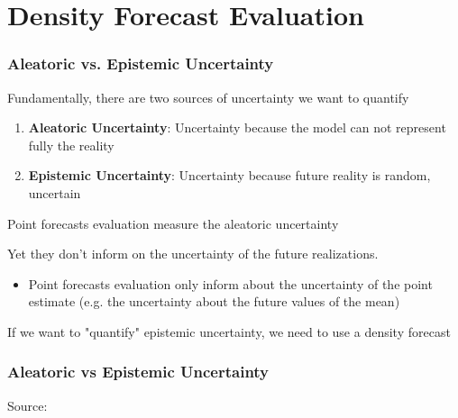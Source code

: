 \documentclass{beamer}
\newenvironment{wideitemize}{\itemize\addtolength{\itemsep}{10pt}}{\enditemize}
\begin{document}
    


    
\section{Density Forecast Evaluation}


\begin{frame}
  \frametitle{Aleatoric vs. Epistemic Uncertainty}
  \begin{wideitemize}
    \item Fundamentally, there are two sources of uncertainty we want to quantify
      \begin{enumerate}
      \item \textbf{Aleatoric Uncertainty}: Uncertainty because the model can not represent fully the reality
      \item \textbf{Epistemic Uncertainty}: Uncertainty because future reality is random, uncertain
      \end{enumerate}
  \item Point forecasts evaluation measure the aleatoric uncertainty
  \item Yet they don't inform on the uncertainty of the future realizations.
    \begin{itemize}
    \item Point forecasts evaluation only inform about the uncertainty of the point estimate (e.g. the uncertainty about the future values of the mean)
    \end{itemize}
  \item If we want to "quantify" epistemic uncertainty, we need to use a density forecast
  \end{wideitemize}
\end{frame}

\begin{frame}
  \frametitle{Aleatoric vs Epistemic Uncertainty}
  \hspace*{15pt}\hbox{\scriptsize Source:}
  
\end{frame}
\end{document}
